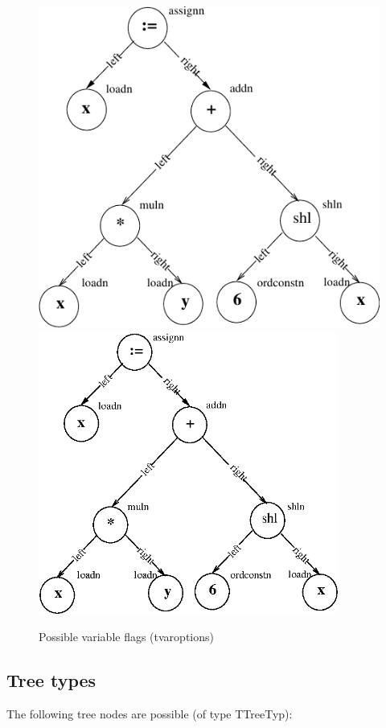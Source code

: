 \documentclass [a4paper,12pt]{article}
\begin{document}
\begin{figure}
\ifpdf
\includegraphics{arch3.pdf}
\else
\includegraphics[width=3.88in,height=3.65in]{arch3.eps}
\fi
\caption{Possible variable flags (tvaroptions)}
\label{fig3}
\end{figure}

\subsection{Tree types}

The following tree nodes are possible (of type \textsf{TTreeTyp):}
\end{document}
